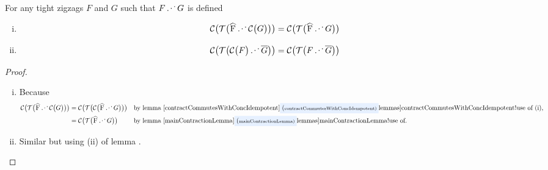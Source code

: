 \begin{lemma}
For any tight zigzags $F$ and $G$ such that $F \cnc G$ is defined
\begin{enumerate}[(i)]
\item
\[
\contract{\tighten{\rng{F} \cnc \contract{G}}}
= \contract{\tighten{\rng{F} \cnc G}} 
\]
\item 
\[
\contract{\tighten{\contract{F} \cnc \rst{G}}}
= \contract{\tighten{F \cnc \rst{G}}} 
\]
\end{enumerate}
\end{lemma}
\begin{proof}
\begin{enumerate}[(i)]
\item
Because
\begin{align*}
\contract{\tighten{\rng{F} \cnc \contract{G}}}
&= \contract{\tighten{\contract{\rng{F} \cnc G}}}
     && \mbox{by lemma \lref{contractCommutesWithConcIdempotent}
           (i),}\\
&= \contract{\tighten{\rng{F} \cnc G}} 
      && \mbox{by lemma \lref{mainContractionLemma}.}
\end{align*}
\item
Similar but using (ii) of lemma .
\end{enumerate}
\end{proof}

